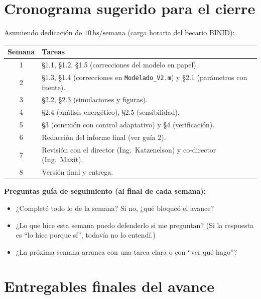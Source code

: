 \documentclass[11pt,a4paper]{article}
\newcommand{\unit}[1]{\,\mathrm{#1}}
\begin{document}
\hrulefill

\section{Cronograma sugerido para el cierre}

Asumiendo dedicación de $10\unit{hs/semana}$ (carga horaria del becario BINID):

\begin{table}[h]
\centering
\begin{tabularx}{\linewidth}{c X}
\toprule
Semana & Tareas \\
\midrule
1 & §1.1, §1.2, §1.5 (correcciones del modelo en papel). \\
2 & §1.3, §1.4 (correcciones en \texttt{Modelado\_V2.m}) y §2.1 (parámetros con fuente). \\
3 & §2.2, §2.3 (simulaciones y figuras). \\
4 & §2.4 (análisis energético), §2.5 (sensibilidad). \\
5 & §3 (conexión con control adaptativo) y §4 (verificación). \\
6 & Redacción del informe final (ver guía 2). \\
7 & Revisión con el director (Ing.\ Katzenelson) y co-director (Ing.\ Maxit). \\
8 & Versión final y entrega. \\
\bottomrule
\end{tabularx}
\end{table}

\begin{guia}
\textbf{Preguntas guía de seguimiento (al final de cada semana):}
\begin{itemize}
    \item ¿Completé todo lo de la semana? Si no, ¿qué bloqueó el avance?
    \item ¿Lo que hice esta semana puedo defenderlo si me preguntan? (Si la respuesta es ``lo hice porque sí'', todavía no lo entendí.)
    \item ¿La próxima semana arranca con una tarea clara o con ``ver qué hago''?
\end{itemize}
\end{guia}

\hrulefill

\section{Entregables finales del avance}
\end{document}
